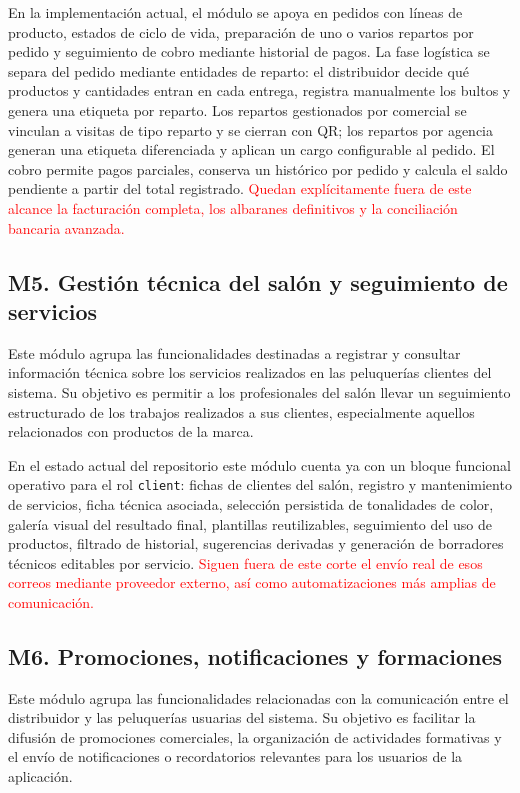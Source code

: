 En la implementación actual, el módulo se apoya en pedidos con líneas de producto, estados de ciclo de vida, preparación de uno o varios repartos por pedido y seguimiento de cobro mediante historial de pagos. La fase logística se separa del pedido mediante entidades de reparto: el distribuidor decide qué productos y cantidades entran en cada entrega, registra manualmente los bultos y genera una etiqueta por reparto. Los repartos gestionados por comercial se vinculan a visitas de tipo reparto y se cierran con QR; los repartos por agencia generan una etiqueta diferenciada y aplican un cargo configurable al pedido. El cobro permite pagos parciales, conserva un histórico por pedido y calcula el saldo pendiente a partir del total registrado. \textcolor{red}{Quedan explícitamente fuera de este alcance la facturación completa, los albaranes definitivos y la conciliación bancaria avanzada.}

\subsection{M5. Gestión técnica del salón y seguimiento de servicios}

Este módulo agrupa las funcionalidades destinadas a registrar y consultar información técnica sobre los servicios realizados en las peluquerías clientes del sistema. Su objetivo es permitir a los profesionales del salón llevar un seguimiento estructurado de los trabajos realizados a sus clientes, especialmente aquellos relacionados con productos de la marca.

En el estado actual del repositorio este módulo cuenta ya con un bloque funcional operativo para el rol \texttt{client}: fichas de clientes del salón, registro y mantenimiento de servicios, ficha técnica asociada, selección persistida de tonalidades de color, galería visual del resultado final, plantillas reutilizables, seguimiento del uso de productos, filtrado de historial, sugerencias derivadas y generación de borradores técnicos editables por servicio. \textcolor{red}{Siguen fuera de este corte el envío real de esos correos mediante proveedor externo, así como automatizaciones más amplias de comunicación.}

\subsection{M6. Promociones, notificaciones y formaciones}

Este módulo agrupa las funcionalidades relacionadas con la comunicación entre el distribuidor y las peluquerías usuarias del sistema. Su objetivo es facilitar la difusión de promociones comerciales, la organización de actividades formativas y el envío de notificaciones o recordatorios relevantes para los usuarios de la aplicación.

